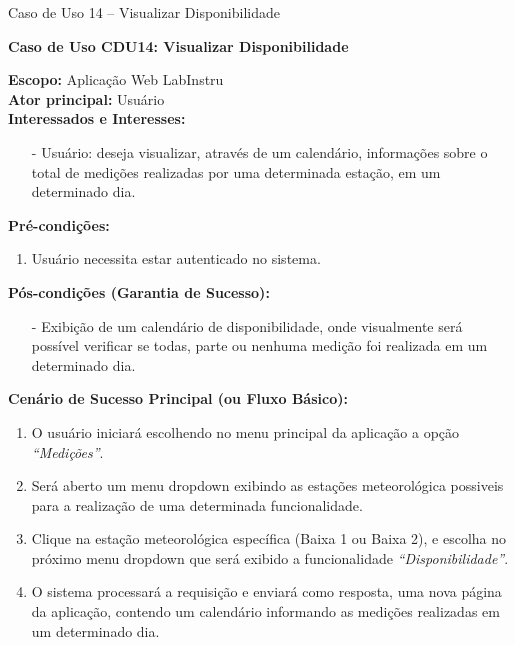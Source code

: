 \begin{quadro}[h!]\caption{Caso de Uso 14 --  Visualizar Disponibilidade}
\hfill
\end{quadro}
	\begin{mdframed}

		\textbf{Caso de Uso CDU14: Visualizar Disponibilidade}\\

		\begin{flushleft}

		\textbf{Escopo:} Aplicação Web LabInstru\\

		\textbf{Ator principal:} Usuário\\

		\textbf{Interessados e Interesses:}
		\begin{itemize}
			\item[-] Usuário: deseja visualizar, através de um calendário, informações sobre o total de medições realizadas por uma determinada estação, em um determinado dia.
		\end{itemize}

		\textbf{Pré-condições:}\\
			 \begin{enumerate}
			 	\item{Usuário necessita estar autenticado no sistema.}
			 \end{enumerate}

		\textbf{Pós-condições (Garantia de Sucesso):}
		\begin{itemize}
			\item[-] Exibição de um calendário de disponibilidade, onde visualmente será possível verificar se todas, parte ou nenhuma medição foi realizada em um determinado dia.
		\end{itemize}

		\textbf{Cenário de Sucesso Principal (ou Fluxo Básico):}
			\begin{enumerate}
				\item{O usuário iniciará escolhendo no menu principal da aplicação a opção \textit{``Medições''}.}
				\item{Será aberto um menu dropdown exibindo as estações meteorológica possiveis para a realização de uma determinada funcionalidade.}
				\item{Clique na estação meteorológica específica (Baixa 1 ou Baixa 2), e escolha no próximo menu dropdown que será exibido a funcionalidade \textit{``Disponibilidade''}.}
				\item{O sistema processará a requisição e enviará como resposta, uma nova página da aplicação, contendo um calendário informando as medições realizadas em um determinado dia.}
			 \end{enumerate}


\end{flushleft}
\end{mdframed}
